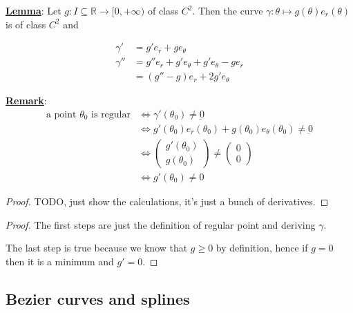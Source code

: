 \documentclass[10pt]{extarticle}
\newcommand{\R}{\mathbb{R}}
\newcommand{\munderbar}[1]{\underbar{\ensuremath{#1}}}
\begin{document}
\textbf{\underline{Lemma}}: Let $g: I \subseteq \R \to [0, +\infty)$ of class $C^2$.
Then the curve $\gamma: \theta \mapsto g(\theta) e_r(\theta)$ is of class $C^2$ and

\begin{align*}
    \gamma'  & = g' e_r + g e_\theta                         \\
    \gamma'' & = g'' e_r + g' e_\theta + g' e_\theta - g e_r \\
             & = (g'' - g) e_r + 2 g' e_\theta
\end{align*}


\textbf{\underline{Remark}}:
\begin{align*}
    \text{a point $\theta_0$ is regular} & \iff \gamma'(\theta_0) \ne \munderbar{0}                                           \\
                                         & \iff g'(\theta_0) e_r(\theta_0) + g(\theta_0) e_\theta(\theta_0) \ne \munderbar{0} \\
                                         & \iff \begin{pmatrix}
                                                    g'(\theta_0) \\ g(\theta_0)
                                                \end{pmatrix} \ne \begin{pmatrix}
                                                                      0 \\ 0
                                                                  \end{pmatrix}                                              \\
                                         & \iff g'(\theta_0) \ne 0
\end{align*}

\begin{proof}
    TODO, just show the calculations, it's just a bunch of derivatives.
\end{proof}

\begin{proof}
    The first steps are just the definition of regular point and deriving $\gamma$.

    The last step is true because we know that $g \geq 0$ by definition, hence if $g = 0$ then it is a minimum and $g' = 0$.
\end{proof}

\subsection{Bezier curves and splines}
\end{document}
